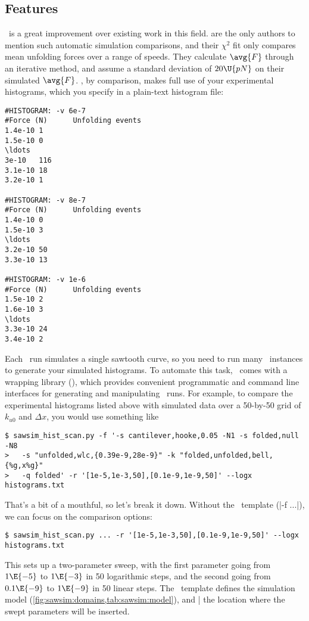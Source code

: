 \subsection{Features}
\label{sec:sawsim:features}

\sawsim\ is a great improvement over existing work in this field.
\citet{best02} are the only authors to mention such automatic
simulation comparisons, and their $\chi^2$ fit only compares mean
unfolding forces over a range of speeds.  They calculate $\avg{F}$
through an iterative method, and assume a standard deviation of
$20\U{pN}$ on their simulated $\avg{F}$.  \sawsim, by comparison,
makes full use of your experimental histograms, which you specify in a
plain-text histogram file:
\begin{center}
\begin{spacing}{1}
\begin{Verbatim}[commandchars=\\\{\}]
#HISTOGRAM: -v 6e-7
#Force (N)      Unfolding events
1.4e-10 1
1.5e-10 0
\ldots
3e-10   116
3.1e-10 18
3.2e-10 1

#HISTOGRAM: -v 8e-7
#Force (N)      Unfolding events
1.4e-10 0
1.5e-10 3
\ldots
3.2e-10 50
3.3e-10 13

#HISTOGRAM: -v 1e-6
#Force (N)      Unfolding events
1.5e-10 2
1.6e-10 3
\ldots
3.3e-10 24
3.4e-10 2
\end{Verbatim}
\end{spacing}
\end{center}

Each \sawsim\ run simulates a single sawtooth curve, so you need to
run many \sawsim\ instances to generate your simulated histograms.  To
automate this task, \sawsim\ comes with a  wrapping
library (\pysawsim), which provides convenient programmatic and
command line interfaces for generating and manipulating \sawsim\ runs.
For example, to compare the experimental histograms listed above with
simulated data over a 50-by-50 grid of $k_{u0}$ and $\Delta x$, you
would use something like
\begin{verbatim}
$ sawsim_hist_scan.py -f '-s cantilever,hooke,0.05 -N1 -s folded,null -N8
>   -s "unfolded,wlc,{0.39e-9,28e-9}" -k "folded,unfolded,bell,{%g,x%g}"
>   -q folded' -r '[1e-5,1e-3,50],[0.1e-9,1e-9,50]' --logx histograms.txt
\end{verbatim}
That's a bit of a mouthful, so let's break it down.  Without the
\sawsim\ template (|-f ...|), we can focus on the comparison
options:
\begin{verbatim}
$ sawsim_hist_scan.py ... -r '[1e-5,1e-3,50],[0.1e-9,1e-9,50]' --logx histograms.txt
\end{verbatim}
This sets up a two-parameter sweep, with the first parameter going
from $1\E{-5}$ to $1\E{-3}$ in 50 logarithmic steps, and the second
going from $0.1\E{-9}$ to $1\E{-9}$ in 50 linear steps.  The
\sawsim\ template defines the simulation model
(\cref{fig:sawsim:domains,tab:sawsim:model}), and |%
the location where the swept parameters will be inserted.

